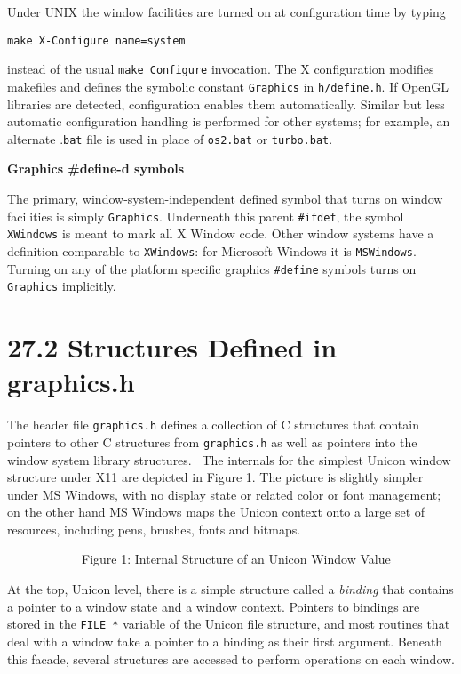 Under UNIX the window facilities are turned on at configuration time by typing

\texttt{make X-Configure name=system}

\noindent instead of the usual \texttt{make Configure} invocation. The
X configuration modifies makefiles and defines the symbolic constant
\texttt{Graphics} in \texttt{h/define.h}. If OpenGL libraries are
detected, configuration enables them automatically. Similar but less
automatic configuration handling is performed for other systems; for
example, an alternate .\texttt{bat} file is used in place of
\texttt{os2.bat} or \texttt{turbo.bat}.

{\sffamily
\textbf{Graphics \#define{}-d symbols}}

The primary, window-system-independent defined symbol that turns on
window facilities is simply \texttt{Graphics}.  Underneath this parent
\texttt{\#ifdef}, the symbol \texttt{XWindows} is meant to mark all X
Window code. Other window systems have a definition comparable to
\texttt{XWindows}: for Microsoft Windows it is \texttt{MSWindows}.
Turning on any of the platform specific graphics
\texttt{\#define} symbols turns on \texttt{Graphics} implicitly.

\section[27.2 Structures Defined in graphics.h]{27.2 Structures Defined in graphics.h}

The header file \texttt{graphics.h} defines a collection of C
structures that contain pointers to other C structures from
\texttt{graphics.h} as well as pointers into the window system library
structures. \ The internals for the simplest Unicon window structure
under X11 are depicted in Figure 1. The picture is slightly simpler
under MS Windows, with no display state or related color or font
management; on the other hand MS Windows maps the Unicon context onto
a large set of resources, including pens, brushes, fonts and bitmaps.


\bigskip


\bigskip


\bigskip


\ \  \ \ \ \ \ \ \ \ \ \ Figure 1: Internal Structure of an Unicon Window Value


At the top, Unicon level, there is a simple structure called a
\textit{binding} that contains a pointer to a window state and a
window context. Pointers to bindings are stored in the \texttt{FILE *}
variable of the Unicon file structure, and most routines that deal
with a window take a pointer to a binding as their first
argument. Beneath this facade, several structures are accessed to
perform operations on each window.

